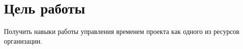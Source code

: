 \section{Цель работы}
Получить навыки работы управления временем проекта как одного из ресурсов организации.

